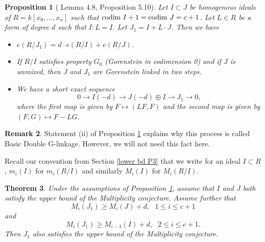 \documentclass[12pt,twoside]{amsart}
\numberwithin{equation}{section}
\newtheorem{theorem}{Theorem}[section]
\newtheorem{proposition}[theorem]{Proposition}
\theoremstyle{definition}
\newtheorem{remark}[theorem]{Remark}
\begin{document}
 \begin{proposition}[\cite{KMMNP} Lemma 4.8, Proposition 5.10] \label{KMMNP result}  Let
 $I \subset J$ be homogenous ideals of $R = k[x_0,\dots,x_n]$ such that
 $\hbox{codim } I + 1 = \hbox{codim } J = c+1$.  Let $L \in R$ be a form of degree $d$ such that
 $I : L = I$.  Let $J_1 = I + L \cdot J$.   Then we have

 \begin{itemize}
 \item[(i)] $e(R/ J_1) = d \cdot e(R/ I) + e(R/ J)$.

 \item[(ii)] If $R/I$ satisfies property $G_0$ (Gorenstein in codimension 0) and if $J$ is
 unmixed, then $J$ and $J_1$ are Gorenstein linked in two steps.

 \item[(iii)] We have a short exact sequence
 \[
 0 \rightarrow I(-d) \rightarrow J(-d) \oplus I \rightarrow J_1 \rightarrow 0,
 \]
 where the first map is given by $F \mapsto (LF,F)$ and the second map  is given by
 $(F,G) \mapsto F-LG$.

 \end{itemize}
 \end{proposition}

 \begin{remark}
 Statement (ii) of Proposition \ref{KMMNP result} explains why this process is called Basic
 Double G-linkage.
 However, we will not need this fact here.
 \end{remark}

Recall our convention from Section \ref{lower bd P3} that we write for an ideal $I
\subset R$, $m_i (I)$ for $m_i (R/I)$ and similarly $M_i (I)$ for $M_i (R/I)$.

\begin{theorem} \label{upper bd for BDL}
Under the assumptions of Proposition \ref{KMMNP result}, assume that $I$ and $J$  both
 satisfy the upper bound of the Multiplicity conjecture.
Assume further that
\begin{equation} \label{upper bd assumption}
M_i(J_1) \geq M_i(J)+d, \ \ \ 1 \leq i \leq c+1
\end{equation}
and
\begin{equation} \label{fact2}
M_i(J_1) \geq M_{i-1}(I)+d, \ \ \ 2 \leq i \leq c+1.
\end{equation}
 Then $J_1$ also satisfies the upper bound of the Multiplicity conjecture.
\end{theorem}

\setcounter{tempp}{\value{equation}}
\end{document}
